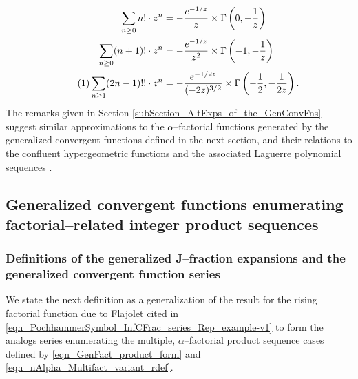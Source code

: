\documentclass[12pt,reqno]{article}
\numberwithin{sfootnote}{section}
\numberwithin{equation}{section}
\newcommand{\tagonce}[0]{
     \addtocounter{equation}{1}
     \tag{\theequation}
}
\theoremstyle{DefaultTheoremStyle}
\theoremstyle{definition}
\newcommand{\cf}[0]{cf.\ }
\begin{document}
\begin{align*} 
\sum_{n \geq 0} n! \cdot z^{n} & = 
     -\frac{e^{-1/z}}{z} \times 
     \Gamma\left(0, -\frac{1}{z}\right) \\ 
\sum_{n \geq 0} (n+1)! \cdot z^{n} & = 
     -\frac{e^{-1/z}}{z^2} \times 
     \Gamma\left(-1, -\frac{1}{z}\right) \\ 
\tagonce\label{eqn_RelatedFormsOf_SgAndDblFact_OGFs-intro_examples-stmts_v1} 
\sum_{n \geq 1} (2n-1)!! \cdot z^{n} & = 
     -\frac{e^{-1 / 2 z}}{(-2z)^{3/2}} \times 
     \Gamma\left(-\frac{1}{2}, -\frac{1}{2 z}\right). 
\end{align*} 
The remarks given in 
Section \ref{subSection_AltExps_of_the_GenConvFns} 
suggest similar approximations to the 
$\alpha$--factorial functions generated by the 
generalized convergent functions defined in the next section, and their 
relations to the confluent hypergeometric functions and the 
associated Laguerre polynomial sequences 
\citep[\cf \S 18.5(ii)]{NISTHB} \citep[\S 4.3.1]{UC}. 

\subsection{Generalized convergent functions enumerating 
            factorial--related integer product sequences} 
\label{subSection_Intro_GenConvFn_Defs_and_Properties} 

\subsubsection{Definitions of the generalized J--fraction expansions and 
               the generalized convergent function series} 

We state the next definition as a 
generalization of the result for the 
rising factorial function due to Flajolet cited in 
\eqref{eqn_PochhammerSymbol_InfCFrac_series_Rep_example-v1} 
to form the analogs series enumerating the 
multiple, $\alpha$--factorial product 
sequence cases defined by \eqref{eqn_GenFact_product_form} and 
\eqref{eqn_nAlpha_Multifact_variant_rdef}. 
\end{document}
